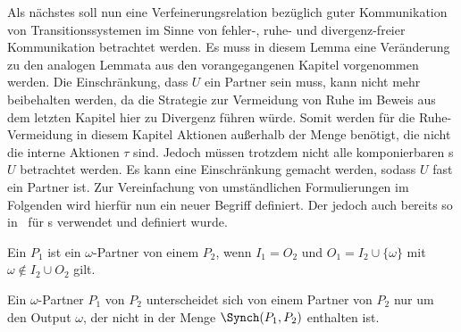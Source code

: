 Als nächstes soll nun eine Verfeinerungsrelation bezüglich guter Kommunikation
von Transitionssystemen im Sinne von fehler-, ruhe- und divergenz-freier
Kommunikation betrachtet werden. Es muss in diesem Lemma eine Veränderung zu
den analogen Lemmata aus den vorangegangenen Kapitel vorgenommen werden. Die
Einschränkung, dass $U$ ein Partner sein muss, kann nicht mehr beibehalten
werden, da die Strategie zur Vermeidung von Ruhe im Beweis aus dem letzten
Kapitel hier zu Divergenz führen würde. Somit werden für die Ruhe-Vermeidung in
diesem Kapitel Aktionen außerhalb der Menge \Synch{} benötigt, die nicht die
interne Aktionen $\tau$ sind. Jedoch müssen trotzdem nicht alle komponierbaren
\MEIO{}s $U$ betrachtet werden. Es kann eine Einschränkung gemacht werden,
sodass $U$ fast ein Partner ist. Zur Vereinfachung von umständlichen
Formulierungen im Folgenden wird hierfür nun ein neuer Begriff definiert. Der
jedoch auch bereits so in~\cite{Schinko2016BA} für \EIO{}s verwendet und
definiert wurde.

\begin{Def}
  Ein \MEIO{} $P_1$ ist ein $\omega$-Partner von einem \MEIO{} $P_2$, wenn
  $I_1=O_2$ und $O_1=I_2\cup\{\omega\}$ mit $\omega\notin I_2\cup O_2$ gilt.
\end{Def}

Ein $\omega$-Partner $P_1$ von $P_2$ unterscheidet sich von einem Partner von
$P_2$ nur um den Output $\omega$, der nicht in der Menge $\Synch (P_1,P_2)$
enthalten ist.

